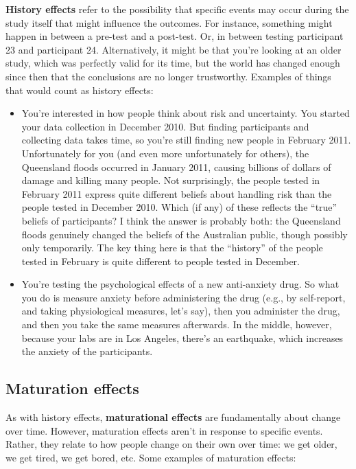 \documentclass[]{book}
\begin{document}
\textbf{History effects} refer to the possibility that specific events may occur during the study itself that might influence the outcomes. For instance, something might happen in between a pre-test and a post-test. Or, in between testing participant 23 and participant 24. Alternatively, it might be that you're looking at an older study, which was perfectly valid for its time, but the world has changed enough since then that the conclusions are no longer trustworthy. Examples of things that would count as history effects:

\begin{itemize}
\item
  You're interested in how people think about risk and uncertainty. You started your data collection in December 2010. But finding participants and collecting data takes time, so you're still finding new people in February 2011. Unfortunately for you (and even more unfortunately for others), the Queensland floods occurred in January 2011, causing billions of dollars of damage and killing many people. Not surprisingly, the people tested in February 2011 express quite different beliefs about handling risk than the people tested in December 2010. Which (if any) of these reflects the ``true'' beliefs of participants? I think the answer is probably both: the Queensland floods genuinely changed the beliefs of the Australian public, though possibly only temporarily. The key thing here is that the ``history'' of the people tested in February is quite different to people tested in December.
\item
  You're testing the psychological effects of a new anti-anxiety drug. So what you do is measure anxiety before administering the drug (e.g., by self-report, and taking physiological measures, let's say), then you administer the drug, and then you take the same measures afterwards. In the middle, however, because your labs are in Los Angeles, there's an earthquake, which increases the anxiety of the participants.
\end{itemize}

\hypertarget{maturation-effects}{%
\subsection{Maturation effects}\label{maturation-effects}}

As with history effects, \textbf{maturational effects} are fundamentally about change over time. However, maturation effects aren't in response to specific events. Rather, they relate to how people change on their own over time: we get older, we get tired, we get bored, etc. Some examples of maturation effects:
\end{document}
